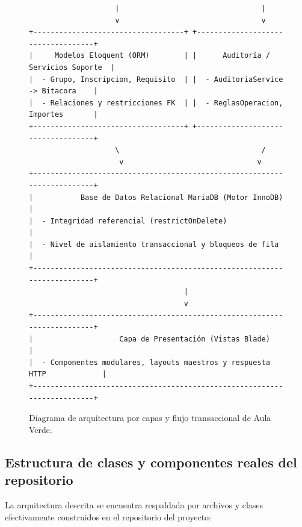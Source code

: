 \begin{figure}[htbp]
\begin{verbatim}
                    |                                 |
                    v                                 v
+-----------------------------------+ +-----------------------------------+
|     Modelos Eloquent (ORM)        | |      Auditoría / Servicios Soporte  |
|  - Grupo, Inscripcion, Requisito  | |  - AuditoriaService -> Bitacora    |
|  - Relaciones y restricciones FK  | |  - ReglasOperacion, Importes       |
+-----------------------------------+ +-----------------------------------+
                    \                                 /
                     v                               v
+-------------------------------------------------------------------------+
|           Base de Datos Relacional MariaDB (Motor InnoDB)                |
|  - Integridad referencial (restrictOnDelete)                            |
|  - Nivel de aislamiento transaccional y bloqueos de fila                 |
+-------------------------------------------------------------------------+
                                    |
                                    v
+-------------------------------------------------------------------------+
|                    Capa de Presentación (Vistas Blade)                  |
|  - Componentes modulares, layouts maestros y respuesta HTTP             |
+-------------------------------------------------------------------------+
\end{verbatim}
\caption{Diagrama de arquitectura por capas y flujo transaccional de Aula Verde.}
\label{fig:arquitectura_flujo}
\end{figure}

\subsection{Estructura de clases y componentes reales del repositorio}
\label{sec:clases_reales}

La arquitectura descrita se encuentra respaldada por archivos y clases efectivamente construidos en el repositorio del proyecto:


